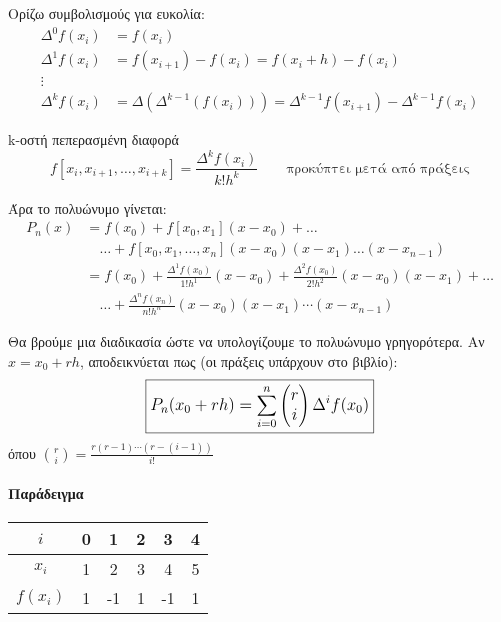 \documentclass[11pt,a4paper,notitlepage,fleqn]{article}
\begin{document}
 	Ορίζω συμβολισμούς για ευκολία:
 	\begin{align*}
 		\Delta^0 f(x_i) &= f(x_i) \\
 		\Delta^1 f(x_i) &=
 		f(x_{i+1}) - f(x_i) = f(x_i+h) - f(x_i) \\
 		\vdots \\
 		\Delta^k f(x_i) &=
 		\Delta \left(\Delta^{k-1}\left(f(x_i)\right)\right)
 		= \Delta^{k-1} f(x_{i+1}) - \Delta^{k-1} f(x_i)
 	\end{align*}
 	
 	\begin{defn}{k-οστή πεπερασμένη διαφορά}{}
 		\[
 			f\left[x_i,x_{i+1},\dots,x_{i+k}\right]
 			= \frac{\Delta^k f(x_i)}{k! h^k}
 			\qquad \text{προκύπτει μετά από πράξεις}
 		\]
 	\end{defn}
 	
 	Άρα το πολυώνυμο γίνεται:
 	\begin{align*}
 	P_n(x) &= f(x_0) + f[x_0,x_1](x-x_0) + \dots
 	\\ & \quad \dots +
 	f[x_0,x_1,\dots,x_n](x-x_0)(x-x_1)\dots(x-x_{n-1})
 	\\ &= f(x_0) + \frac{\Delta^1 f(x_0)}{1!h^1}(x-x_0)
 	+ \frac{\Delta^2 f(x_0)}{2!h^2}(x-x_0)(x-x_1) + \dots \\
 	& \quad \dots + \frac{\Delta^n f(x_n)}{n!h^n}
 	(x-x_0)(x-x_1)\cdots
 	(x-x_{n-1})
 	\end{align*}
 	
 	Θα βρούμε μια διαδικασία ώστε να υπολογίζουμε το πολυώνυμο
 	γρηγορότερα. Αν \( x = x_0+rh \), αποδεικνύεται πως
 	(οι πράξεις υπάρχουν στο βιβλίο):
 	\[
 	\mathlarger{
 		\boxed{
 			P_n(x_0+rh) = \sum_{i=0}^{n}
 			\left(\begin{matrix}
 			r\\i
 			\end{matrix}\right)
 			\Delta^i f(x_0)
 			}
 		}
 	\]
 	όπου \( \displaystyle \binom{r}{i} =
 	\frac{r(r-1)\cdots\left(r-(i-1)\right)}{i!} \)
 	
 	\paragraph{Παράδειγμα}
 	\hspace{0pt}
 	
 	\begin{tabular}{|c|c|c|c|c|c|}
 		\(i\) & 0 & 1 & 2 & 3 & 4\\ 
 		\hline 
 		\(x_i\) & 1 & 2 & 3 & 4 & 5\\ 
 		\hline 
 		\(f(x_i)\) & 1 & -1 & 1 & -1 & 1
 	\end{tabular}
 	
\end{document}
